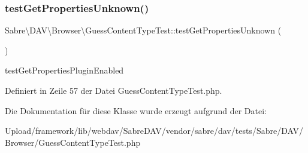 \subsubsection{\texorpdfstring{test\+Get\+Properties\+Unknown()}{testGetPropertiesUnknown()}}
{\footnotesize\ttfamily Sabre\textbackslash{}\+D\+A\+V\textbackslash{}\+Browser\textbackslash{}\+Guess\+Content\+Type\+Test\+::test\+Get\+Properties\+Unknown (\begin{DoxyParamCaption}{ }\end{DoxyParamCaption})}

test\+Get\+Properties\+Plugin\+Enabled 

Definiert in Zeile 57 der Datei Guess\+Content\+Type\+Test.\+php.



Die Dokumentation für diese Klasse wurde erzeugt aufgrund der Datei\+:\begin{DoxyCompactItemize}
\item 
Upload/framework/lib/webdav/\+Sabre\+D\+A\+V/vendor/sabre/dav/tests/\+Sabre/\+D\+A\+V/\+Browser/Guess\+Content\+Type\+Test.\+php\end{DoxyCompactItemize}
